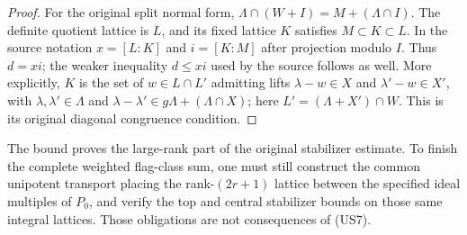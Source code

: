 \begin{proof}
For the original split normal form,
$\Lambda\cap(W+I)=M+(\Lambda\cap I)$.  The definite
quotient lattice is $L$, and its fixed lattice $K$ satisfies
$M\subset K\subset L$.  In the source notation
$x=[L:K]$ and $i=[K:M]$ after projection modulo $I$.
Thus $d=xi$; the weaker inequality $d\leq xi$ used by
the source follows as well.  More explicitly, $K$ is the
set of $w\in L\cap L'$ admitting lifts
$\lambda-w\in X$ and $\lambda'-w\in X'$, with
$\lambda,\lambda'\in\Lambda$ and
$\lambda-\lambda'\in g\Lambda+(\Lambda\cap X)$;
here $L'=(\Lambda+X')\cap W$.
This is its original diagonal congruence condition.
\end{proof}

The bound proves the large-rank part of the original
stabilizer estimate.  To finish the complete weighted
flag-class sum, one must still construct the common
unipotent transport placing the rank-$(2r+1)$ lattice
between the specified ideal multiples of $P_0$, and
verify the top and central stabilizer bounds on those
same integral lattices.  Those obligations are not
consequences of (US7).
